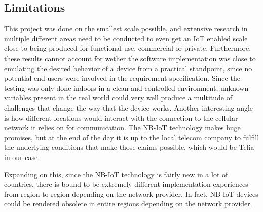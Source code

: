 \subsection{Limitations}
This project was done on the smallest scale possible, and extensive research in multiple different areas need to be conducted to even get an IoT enabled scale close to being produced for functional use, commercial or private.
Furthermore, these results cannot account for wether the software implementation was close to emulating the desired behavior of a device from a practical standpoint, since no potential end-users were involved in the requirement specification.
Since the testing was only done indoors in a clean and controlled environment, unknown variables present in the real world could very well produce a multitude of challenges that change the way that the device works. Another interesting angle is how different locations would interact with the connection to the cellular network it relies on for communication. The NB-IoT technology makes huge promises, but at the end of the day it is up to the local telecom company to fulfill the underlying conditions that make those claims possible, which would be Telia in our case.

Expanding on this, since the NB-IoT technology is fairly new in a lot of countries, there is bound to be extremely different implementation experiences from region to region depending on the network provider. In fact, NB-IoT devices could be rendered obsolete in entire regions depending on the network provider.
